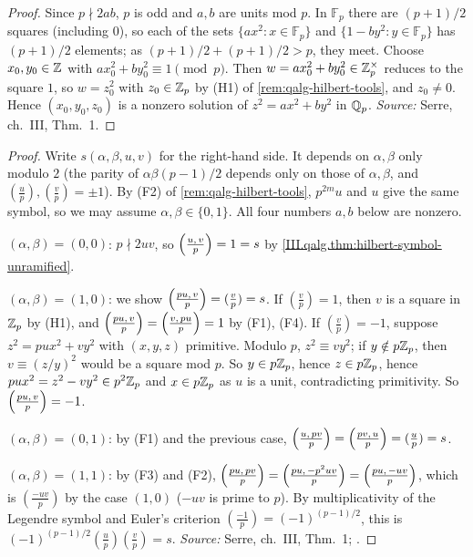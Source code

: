 \begin{theorem}
\end{theorem}
\begin{proof}
Since $p\nmid2ab$, $p$ is odd and $a,b$ are units mod $p$. In $\mathbb F_p$ there are $(p+1)/2$ squares (including $0$), so each of the sets
$\{ax^2:x\in\mathbb F_p\}$ and $\{1-by^2:y\in\mathbb F_p\}$ has $(p+1)/2$ elements; as $(p+1)/2+(p+1)/2>p$, they meet. Choose $x_0,y_0\in\mathbb{Z}$ with
$ax_0^2+by_0^2\equiv1\pmod p$. Then $w=ax_0^2+by_0^2\in\mathbb{Z}_p^\times$ reduces to the square $1$, so $w=z_0^2$ with $z_0\in\mathbb{Z}_p$ by (H1) of
\cref{rem:qalg-hilbert-tools}, and $z_0\ne0$. Hence $(x_0,y_0,z_0)$ is a nonzero solution of $z^2=ax^2+by^2$ in $\mathbb{Q}_p$. \emph{Source:}
Serre, ch.~III, Thm.~1.
\end{proof}

\begin{theorem}
\end{theorem}
\begin{proof}
Write $s(\alpha,\beta,u,v)$ for the right-hand side. It depends on $\alpha,\beta$ only modulo $2$ (the parity of $\alpha\beta(p-1)/2$ depends only on
those of $\alpha,\beta$, and $(\frac up),(\frac vp)=\pm1$). By (F2) of \cref{rem:qalg-hilbert-tools}, $p^{2m}u$ and $u$ give the same symbol, so we may
assume $\alpha,\beta\in\{0,1\}$. All four numbers $a,b$ below are nonzero.

$(\alpha,\beta)=(0,0)$: $p\nmid 2uv$, so $\Bigl(\tfrac{u,\,v}{p}\Bigr)=1=s$ by \cref{III.qalg.thm:hilbert-symbol-unramified}.

$(\alpha,\beta)=(1,0)$: we show $\Bigl(\tfrac{pu,\,v}{p}\Bigr)=(\frac vp)=s$. If $(\frac vp)=1$, then $v$ is a square in $\mathbb{Z}_p$ by (H1), and $\Bigl(\tfrac{pu,\,v}{p}\Bigr)=\Bigl(\tfrac{v,\,pu}{p}\Bigr)=1$ by
(F1), (F4). If $(\frac vp)=-1$, suppose $z^2=pux^2+vy^2$ with $(x,y,z)$ primitive. Modulo $p$, $z^2\equiv vy^2$; if $y\notin p\mathbb{Z}_p$, then $v\equiv(z/y)^2$
would be a square mod $p$. So $y\in p\mathbb{Z}_p$, hence $z\in p\mathbb{Z}_p$, hence $pux^2=z^2-vy^2\in p^2\mathbb{Z}_p$ and $x\in p\mathbb{Z}_p$ as $u$ is a unit, contradicting
primitivity. So $\Bigl(\tfrac{pu,\,v}{p}\Bigr)=-1$.

$(\alpha,\beta)=(0,1)$: by (F1) and the previous case, $\Bigl(\tfrac{u,\,pv}{p}\Bigr)=\Bigl(\tfrac{pv,\,u}{p}\Bigr)=(\frac up)=s$.

$(\alpha,\beta)=(1,1)$: by (F3) and (F2), $\Bigl(\tfrac{pu,\,pv}{p}\Bigr)=\Bigl(\tfrac{pu,\,-p^2uv}{p}\Bigr)=\Bigl(\tfrac{pu,\,-uv}{p}\Bigr)$, which is $(\frac{-uv}p)$ by the case $(1,0)$ ($-uv$ is
prime to $p$). By multiplicativity of the Legendre symbol and Euler's criterion $(\frac{-1}p)=(-1)^{(p-1)/2}$, this is
$(-1)^{(p-1)/2}(\frac up)(\frac vp)=s$. \emph{Source:} Serre, ch.~III, Thm.~1; \cite[§12.4]{Voi}.
\end{proof}


